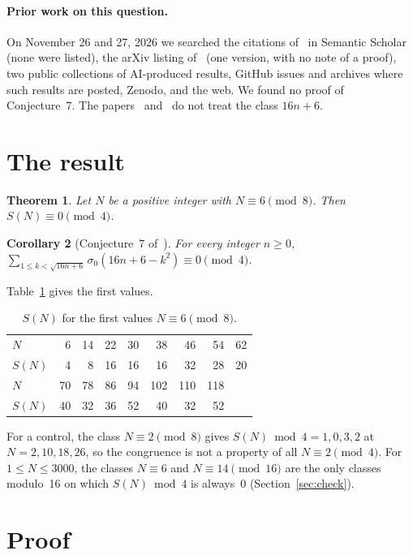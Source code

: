 \documentclass[11pt]{article}
\newtheorem{theorem}{Theorem}
\newtheorem{corollary}[theorem]{Corollary}
\theoremstyle{remark}
\begin{document}
\paragraph{Prior work on this question.} On November 26 and 27, 2026 we searched the citations of~\cite{JKKMS} in Semantic Scholar (none were listed), the arXiv listing of~\cite{JKKMS} (one version, with no note of a proof), two public collections of AI-produced results, GitHub issues and archives where such results are posted, Zenodo, and the web. We found no proof of Conjecture~7. The papers~\cite{Keith} and~\cite{DK} do not treat the class $16n+6$.

\section{The result}

\begin{theorem}\label{thm:main}
Let $N$ be a positive integer with $N\equiv 6\pmod 8$. Then $S(N)\equiv 0\pmod 4$.
\end{theorem}

\begin{corollary}[Conjecture~7 of~\cite{JKKMS}]
For every integer $n\ge 0$, $\sum_{1\le k<\sqrt{16n+6}}\sigma_0(16n+6-k^2)\equiv 0\pmod 4$.
\end{corollary}

Table~\ref{tab:values} gives the first values.
\begin{table}[h]
\centering
\begin{tabular}{l*{8}{r}}
\toprule
$N$ & 6 & 14 & 22 & 30 & 38 & 46 & 54 & 62\\
$S(N)$ & 4 & 8 & 16 & 16 & 16 & 32 & 28 & 20\\
\midrule
$N$ & 70 & 78 & 86 & 94 & 102 & 110 & 118 & \\
$S(N)$ & 40 & 32 & 36 & 52 & 40 & 32 & 52 & \\
\bottomrule
\end{tabular}
\caption{$S(N)$ for the first values $N\equiv 6\pmod 8$.}\label{tab:values}
\end{table}

For a control, the class $N\equiv 2\pmod 8$ gives $S(N)\bmod 4=1, 0, 3, 2$ at $N=2,10,18,26$, so the congruence is not a property of all $N\equiv 2\pmod 4$. For $1\le N\le 3000$, the classes $N\equiv 6$ and $N\equiv 14\pmod{16}$ are the only classes modulo~16 on which $S(N)\bmod 4$ is always~$0$ (Section~\ref{sec:check}).

\section{Proof}
\end{document}
